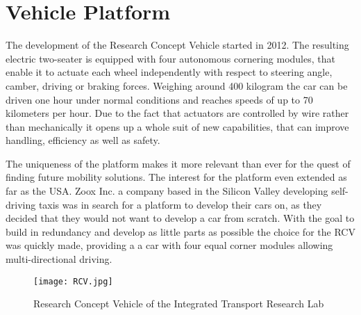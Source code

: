 \chapter{Vehicle Platform}
The development of the Research Concept Vehicle started in 2012. The resulting electric two-seater is equipped with four autonomous cornering modules, that enable it to actuate each wheel independently with respect to steering angle, camber, driving or braking forces. Weighing around 400 kilogram the car can be driven one hour under normal conditions and reaches speeds of up to 70 kilometers per hour. Due to the fact that actuators are controlled by wire rather than mechanically it opens up a whole suit of new capabilities, that can improve handling, efficiency as well as safety.

The uniqueness of the platform makes it more relevant than ever for the quest of finding future mobility solutions. The interest for the platform even extended as far as the USA. Zoox Inc. a company based in the Silicon Valley developing self-driving taxis was in search for a platform to develop their cars on, as they decided that they would not want to develop a car from scratch. With the goal to build in redundancy and develop as little parts as possible the choice for the RCV was quickly made, providing a a car with four equal corner modules allowing multi-directional driving. \cite{Harris.2015}

\begin{figure}[h]
\texttt{[image: RCV.jpg]}
\caption[Research Concept Vehicle of the ITRL]{Research Concept Vehicle of the Integrated Transport Research Lab}
\label{fig:RCV}
\end{figure}